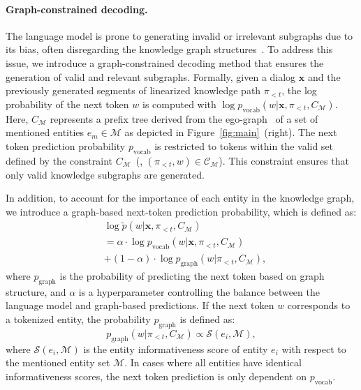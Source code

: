\paragraph{Graph-constrained decoding.}
The language model is prone to generating invalid or irrelevant subgraphs due to its bias, often disregarding the knowledge graph structures~\cite{de2021autoregressive,chen2022relation}.
To address this issue, we introduce a graph-constrained decoding method that ensures the generation of valid and relevant subgraphs.
Formally, given a dialog $\boldsymbol{x}$ and the previously generated segments of linearized knowledge path ${\pi}_{<t}$, the log probability of the next token $w$ is computed with $\log p_{\text{vocab}}\left(w|\boldsymbol{x}, {\pi}_{<t}, C_{\mathcal{M}} \right)$.
Here, $C_{\mathcal{M}}$ represents a prefix tree derived from the ego-graph~\cite{zhu2021transfer} of a set of mentioned entities $e_m \in \mathcal{M}$ as depicted in Figure~\ref{fig:main}~(right).
The next token prediction probability $p_{\text{vocab}}$ is restricted to tokens within the valid set defined by the constraint $C_{\mathcal{M}}$~(\ie, $({\pi}_{<t}, w) \in \mathcal{C}_{\mathcal{M}}$).
This constraint ensures that only valid knowledge subgraphs are generated.

In addition, to account for the importance of each entity in the knowledge graph, we introduce a graph-based next-token prediction probability, which is defined as:
\begin{equation}
\label{eq:constraint}
\begin{split}
&\log\tilde{p}(w|\boldsymbol{x}, {\pi}_{<t}, C_{\mathcal{M}}) \\
&= \alpha \cdot \log p_{\text{vocab}}\left(w|\boldsymbol{x}, {\pi}_{<t}, C_{\mathcal{M}} \right)\\&+ {(1-\alpha)}\cdot \log p_{\text{graph}}\left(w| {\pi}_{<t}, C_{\mathcal{M}} \right),
\end{split}
\end{equation}
where $p_{\text{graph}}$ is the probability of predicting the next token based on graph structure, and $\alpha$ is a hyperparameter controlling the balance between the language model and graph-based predictions. 
If the next token $w$ corresponds to a tokenized entity, the probability $p_{\text{graph}}$ is defined as:
\begin{equation}
    p_{\text{graph}}\left(w| {\pi}_{<t},  C_{\mathcal{M}}\right) \propto \mathcal{S}(e_i, \mathcal{M}),
\end{equation}
where $\mathcal{S}\left(e_i, \mathcal{M} \right)$ is the entity informativeness score of entity $e_i$ with respect to the mentioned entity set $\mathcal{M}$. 
 In cases where all entities have identical informativeness scores, the next token prediction is only dependent on $p_{\text{vocab}}$.

